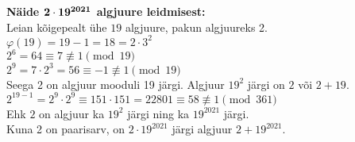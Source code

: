 \documentclass{beamer}
\begin{document}
\begin{frame}
\textbf{Näide $\bf{2\cdot19^{2021}}$ algjuure leidmisest:}\\
Leian kõigepealt ühe $19$ algjuure, pakun algjuureks 2.\\
$\varphi(19)=19-1=18=2\cdot3^2$\\
$2^6=64\equiv7\not\equiv1\pmod{19}$\\
$2^9=7\cdot2^3=56\equiv-1\not\equiv1\pmod{19}$\\
Seega 2 on algjuur mooduli 19 järgi. Algjuur $19^2$ järgi on $2$ või $2+19$.\\
$2^{19-1}=2^9\cdot2^9\equiv151\cdot151=22801\equiv58\not\equiv1\pmod{361}$\\
Ehk $2$ on algjuur ka $19^2$ järgi ning ka $19^{2021}$ järgi.\\
Kuna 2 on paarisarv, on $2\cdot19^{2021}$ järgi algjuur $2+19^{2021}$.
\end{frame}
\end{document}
